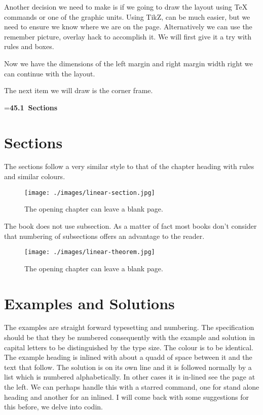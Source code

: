 Another decision we need to make is if we going to draw the layout using TeX commands or one of the graphic units. Using TikZ, can be much easier, but we need to ensure we know where we are on the page. Alternatively we can use the remember picture, overlay hack to accomplish it. We will first give it a try with rules and boxes.

Now we have the dimensions of the left margin and right margin width right we can continue with the layout.

The next item we will draw is the corner frame.
\bigskip

\bgroup
\parindent0pt
\parskip0pt
\offinterlineskip

\newbox\sectiontitlebox
\setbox\sectiontitlebox=\hbox{\hspace*{-2.5cm}\Large\bfseries\arial \mbox{\color{orange200}45.1} \mbox{\color{smithsonian}Sections}}\copy\sectiontitlebox\par
\vskip-6.5pt
\leavevmode%
\color{cyan500}%
%
\egroup

\section{Sections}

The sections follow a very similar style to that of the chapter heading with rules and similar colours. 

\begin{figure}[htbp]
\texttt{[image: ./images/linear-section.jpg]}
\caption{The opening chapter can leave a blank page. }
\end{figure}

The book does not use subsection. As a matter of fact most books don’t consider that numbering of subsections offers an advantage to the reader. 

\begin{figure}[htbp]
\texttt{[image: ./images/linear-theorem.jpg]}
\caption{The opening chapter can leave a blank page. }
\end{figure}


\section{Examples and Solutions}

The examples are straight forward typesetting and numbering. The specification should be that they be numbered consequently with the example and solution in capital letters to be distinguished by the type size. The colour is to be identical. The example heading is inlined with about a quadd of space between it and the text that follow. The solution is on its own line and it is followed normally by a list which is numbered alphabetically. In other cases it is in-lined see the page at the left. We can perhaps handle this with a starred command, one for stand alone heading and another for an inlined. I will come back with some suggestions for this before, we delve into codin.

